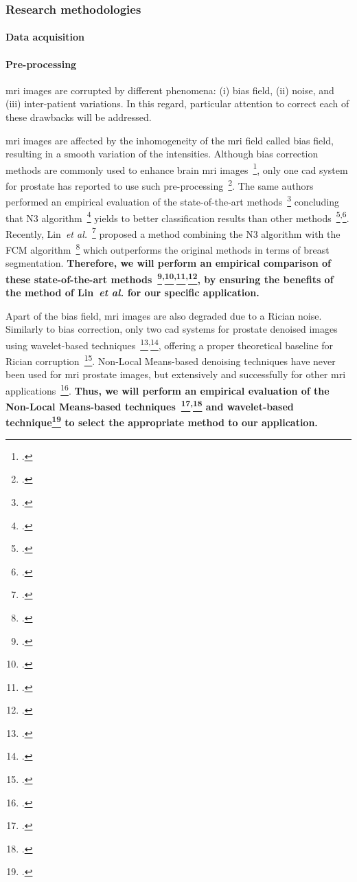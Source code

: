 \subsubsection{Research methodologies}
\label{sec:methodologies}

\paragraph{Data acquisition}

\paragraph{Pre-processing}

\Ac{mri} images are corrupted by different phenomena: (i) bias field, (ii) noise, and (iii) inter-patient variations.
In this regard, particular attention to correct each of these drawbacks will be addressed.

\Ac{mri} images are affected by the inhomogeneity of the \ac{mri} field called bias field, resulting in a smooth variation of the intensities.
Although bias correction methods are commonly used to enhance brain \ac{mri} images~\footcite{Vovk2007}, only one \ac{cad} system for prostate has reported to use such pre-processing~\footcite{Viswanath2009}.
The same authors performed an empirical evaluation of the state-of-the-art methods~\footcite{viswanath2011empirical} concluding that N3 algorithm~\footcite{Sled1998} yields to better classification results than other methods~\footcite{Styner2000}\textsuperscript{,}\footcite{Cohen2000}.
Recently, Lin~\emph{et al.}~\footcite{Lin2011} proposed a method combining the N3 algorithm with the FCM algorithm~\footcite{Ahmed2002} which outperforms the original methods in terms of breast segmentation.
\textbf{Therefore, we will perform an empirical comparison of these state-of-the-art methods~\footcite{Sled1998}\textsuperscript{,}\footcite{Styner2000}\textsuperscript{,}\footcite{Cohen2000}\textsuperscript{,}\footcite{Lin2011}, by ensuring the benefits of the method of Lin~\emph{et al.} for our specific application.}

Apart of the bias field, \Ac{mri} images are also degraded due to a Rician noise.
Similarly to bias correction, only two \ac{cad} systems for prostate denoised images using wavelet-based techniques~\footcite{Mallat2008}\textsuperscript{,}\footcite{Pizurica2003}, offering a proper theoretical baseline for Rician corruption~\footcite{Nowak1999}.
Non-Local Means-based denoising techniques have never been used for \ac{mri} prostate images, but extensively and successfully for other \ac{mri} applications~\footcite{Manjon2008}.
\textbf{Thus, we will perform an empirical evaluation of the Non-Local Means-based techniques~\footcite{Manjon2012}\textsuperscript{,}\footcite{Coupe2011} and wavelet-based technique\footcite{Pizurica2003} to select the appropriate method to our application.}

